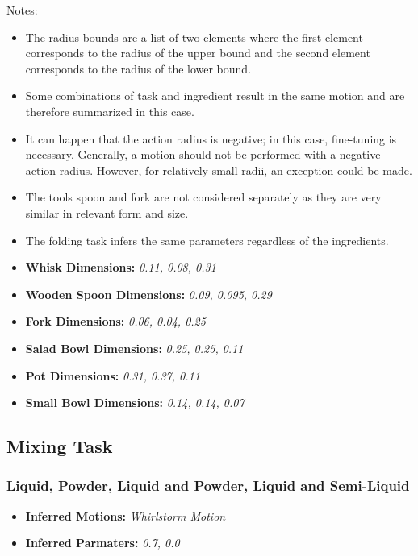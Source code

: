 Notes:
\begin{itemize}
    \item The radius bounds are a list of two elements where the first element corresponds to the radius of the upper bound and the second element corresponds to the radius of the lower bound.
    \item Some combinations of task and ingredient result in the same motion and are therefore summarized in this case.
    \item It can happen that the action radius is negative; in this case, fine-tuning is necessary. Generally, a motion should not be performed with a negative action radius. However, for relatively small radii, an exception could be made.
    \item The tools spoon and fork are not considered separately as they are very similar in relevant form and size.
    \item The folding task infers the same parameters regardless of the ingredients.
    \item \textbf{Whisk Dimensions:} \textit{0.11, 0.08, 0.31}
    \item \textbf{Wooden Spoon Dimensions:} \textit{0.09, 0.095, 0.29}
    \item \textbf{Fork Dimensions:} \textit{0.06, 0.04, 0.25}
    \item \textbf{Salad Bowl Dimensions:} \textit{0.25, 0.25, 0.11}
    \item \textbf{Pot Dimensions:} \textit{0.31, 0.37, 0.11}
    \item \textbf{Small Bowl Dimensions:} \textit{0.14, 0.14, 0.07}
\end{itemize}


\subsection{Mixing Task}
\subsubsection{Liquid, Powder, Liquid and Powder, Liquid and Semi-Liquid}
\begin{itemize}
    \item \textbf{Inferred Motions:} \textit{Whirlstorm Motion}
    \item \textbf{Inferred Parmaters:} \textit{0.7, 0.0}
\end{itemize}

